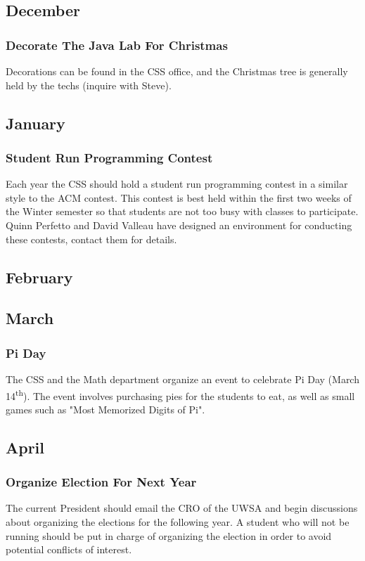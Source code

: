 \documentclass[12pt]{article}
\begin{document}
\subsection{December}

\subsubsection{Decorate The Java Lab For Christmas}
Decorations can be found in the CSS office, and the Christmas tree is generally
held by the techs (inquire with Steve).

\subsection{January}

\subsubsection{Student Run Programming Contest}
Each year the CSS should hold a student run programming contest in a similar
style to the ACM contest.  This contest is best held within the first two weeks
of the Winter semester so that students are not too busy with classes to
participate.  Quinn Perfetto and David Valleau have designed an environment for
conducting these contests, contact them for details.


\subsection{February}
\subsection{March}

\subsubsection{Pi Day}
The CSS and the Math department organize an event to celebrate Pi Day (March 14\textsuperscript{th}).
The event involves purchasing pies for the students to eat, as well as small games such as "Most Memorized
Digits of Pi".

\subsection{April}

\subsubsection{Organize Election For Next Year}
The current President should email the CRO of the UWSA and begin discussions
about organizing the elections for the following year.  A student who will not
be running should be put in charge of organizing the election in order to avoid
potential conflicts of interest.
\end{document}

